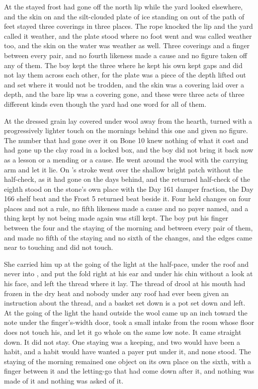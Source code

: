 At  the stayed frost had gone off the north lip while the yard looked elsewhere, and the skin on  and the silt-clouded plate of ice standing on  out of the path of feet stayed three coverings in three places. The rope knocked the lip and the yard called it weather, and the plate stood where no foot went and was called weather too, and the skin on the water was weather as well. Three coverings and a finger between every pair, and no fourth likeness made a cause and no figure taken off any of them. The boy kept the three where he kept his own kept gaps and did not lay them across each other, for the plate was a piece of the depth lifted out and set where it would not be trodden, and the skin was a covering laid over a depth, and the bare lip was a covering gone, and these were three acts of three different kinds even though the yard had one word for all of them.

At  the dressed grain lay covered under wool away from the hearth, turned with a progressively lighter touch on the mornings behind this one and given no figure. The number that had gone over it on Bone 10 knew nothing of what it cost and had gone up the clay road in a locked box, and the boy did not bring it back now as a lesson or a mending or a cause. He went around the wool with the carrying arm and let it lie. On  's stroke went over the shallow bright patch without the half-check, as it had gone on the days behind, and the returned half-check of the eighth stood on the stone's own place with the Day 161 damper fraction, the Day 166 shelf beat and the Frost 5 returned beat beside it. Four held changes on four places and not a rule, no fifth likeness made a cause and no payer named, and a thing kept by not being made again was still kept. The boy put his finger between the four and the staying of the morning and between every pair of them, and made no fifth of the staying and no sixth of the changes, and the edges came near to touching and did not touch.

\scenebreak

She carried him up at the going of the light at the half-pace, under the roof and never into , and put the fold right at his ear and under his chin without a look at his face, and left the thread where it lay. The thread of drool at his mouth had frozen in the dry heat and nobody under any roof had ever been given an instruction about the thread, and a basket set down is a pot set down and left. At the going of the light the hand outside the wool came up an inch toward the note under the finger's-width door, took a small intake from the room whose floor does not touch his, and let it go whole on the same low note. It came straight down. It did not stay. One staying was a keeping, and two would have been a habit, and a habit would have wanted a payer put under it, and none stood. The staying of the morning remained one object on its own place on the sixth, with a finger between it and the letting-go that had come down after it, and nothing was made of it and nothing was asked of it.

